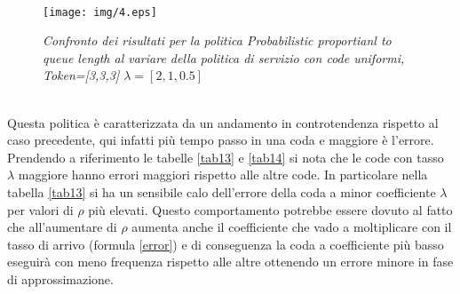 \documentclass[12pt,a4paper,italian]{article}
\begin{document}
\begin{table}[ht!]
\begin{minipage}[b]{0.48\linewidth}
\begin{tabular}{c c c c c}
		\end{tabular}
		
	\end{minipage}
\end{table}
\ \ \
\newpage
\begin{figure}[ht!]
	\centering
	\texttt{[image: img/4.eps]}
	\caption{\emph{Confronto dei risultati per la politica Probabilistic proportianl to queue length al variare della politica di servizio con code uniformi, Token=[3,3,3] $\lambda=[2,1,0.5]$}}
\end{figure}
\ \\
Questa politica è caratterizzata da un andamento in controtendenza rispetto al caso precedente, qui infatti più tempo passo in una coda e maggiore è l'errore. Prendendo a riferimento le tabelle \ref{tab13} e \ref{tab14} si nota che le code con tasso $\lambda$ maggiore hanno errori maggiori rispetto alle altre code. In particolare nella tabella \ref{tab13} si ha un sensibile calo dell'errore della coda a minor coefficiente $\lambda$ per valori di $\rho$ più elevati. Questo comportamento potrebbe essere dovuto al fatto che all'aumentare di $\rho$ aumenta anche il coefficiente che vado a moltiplicare con il  tasso di arrivo (formula \ref{error}) e di conseguenza la coda a coefficiente più basso eseguirà con meno frequenza rispetto alle altre ottenendo un errore minore in fase di approssimazione. 
\newpage
\end{document}
